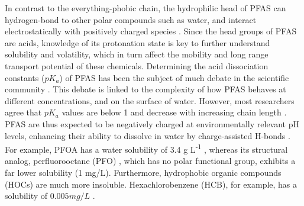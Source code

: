 In contrast to the everything-phobic chain, the hydrophilic head of PFAS can hydrogen-bond to other polar compounds such as water, and interact electrostatically with positively charged species \citep{sigmund2022sorption}. Since the head groups of PFAS are acids, knowledge of its protonation state is key to further understand solubility and volatility, which in turn affect the mobility and long range transport potential of these chemicals. Determining the acid dissociation constants (\(pK_a\)) of PFAS has been the subject of much debate in the scientific community \citep{Goss2009comment}. This debate is linked to the complexity of how PFAS behaves at different concentrations, and on the surface of water. However, most researchers agree that \(pK_a\) values are below 1 and decrease with increasing chain length \citep{wang2011physchem,Reemtsma2016}. PFAS are thus expected to be negatively charged at environmentally relevant pH levels, enhancing their ability to dissolve in water by charge-assisted H-bonds \citep{Reemtsma2016}. For example, PFOA has a water solubility of 3.4 g L\textsuperscript{-1} \citep{PFOA}, whereas its structural analog, perfluorooctane (PFO) \citep{PFO}, which has no polar functional group, exhibits a far lower solubility (1 mg/L). Furthermore, hydrophobic organic compounds (\acrshort{HOC}s) are much more insoluble. Hexachlorobenzene (HCB), for example, has a solubility of $0.005 mg/L$ \citep{mcphedran2013hydrophobic}. 


